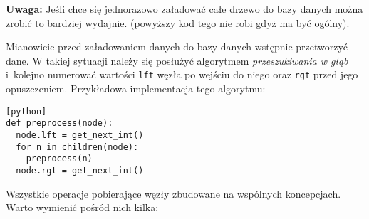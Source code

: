
\textbf{Uwaga:} Jeśli chce się jednorazowo załadować całe drzewo do bazy danych można zrobić to bardziej wydajnie.
(powyższy kod tego nie robi gdyż ma być ogólny).

Mianowicie przed załadowaniem danych do bazy danych wstępnie przetworzyć dane.
W takiej sytuacji należy się posłużyć algorytmem \emph{przeszukiwania w głąb}
i~kolejno numerować wartości \texttt{lft} węzła po wejściu do niego oraz \texttt{rgt} przed jego opuszczeniem.
Przykładowa implementacja tego algorytmu:

\begin{verbatim}[python]
def preprocess(node):
  node.lft = get_next_int()
  for n in children(node):
    preprocess(n)
  node.rgt = get_next_int()
\end{verbatim}

%
%








Wszystkie operacje pobierające węzły zbudowane na wspólnych koncepcjach.
Warto wymienić pośród nich kilka:
%
%        


